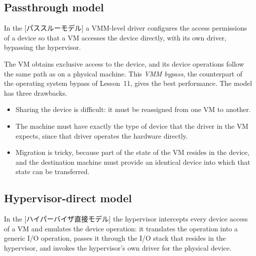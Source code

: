 \documentclass[../main.tex]{subfiles}
\begin{document}
\subsection{Passthrough model}

\begin{definition}
  In the [パススルーモデル] a VMM-level driver
  configures the access permissions of a device so that a VM accesses the
  device directly, with its own driver, bypassing the hypervisor.
\end{definition}

The VM obtains exclusive access to the device, and its device operations
follow the same path as on a physical machine.  This \emph{VMM bypass},
the counterpart of the operating system bypass of
Lesson~11, gives the best performance.  The
model has three drawbacks.
\begin{itemize}
  \item Sharing the device is difficult: it must be reassigned from one VM
    to another.
  \item The machine must have exactly the type of device that the driver in
    the VM expects, since that driver operates the hardware directly.
  \item Migration is tricky, because part of the state of the VM resides
    in the device, and the destination machine must provide an identical
    device into which that state can be transferred.
\end{itemize}

\subsection{Hypervisor-direct model}

\begin{definition}
  In the [ハイパーバイザ直接モデル] the
  hypervisor intercepts every device access of a VM and emulates the device
  operation: it translates the operation into a generic I/O operation,
  passes it through the I/O stack that resides in the hypervisor, and
  invokes the hypervisor's own driver for the physical device.
\end{definition}
\end{document}
